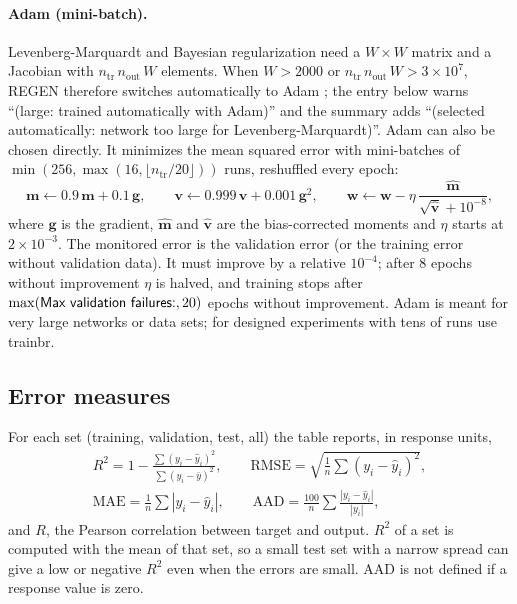 \paragraph{Adam (mini-batch).} Levenberg-Marquardt and Bayesian regularization need a $W\times W$ matrix and a
Jacobian with $n_\text{tr}\,n_\text{out}\,W$ elements. When $W > 2000$ or $n_\text{tr}\,n_\text{out}\,W > 3\times
10^{7}$, REGEN therefore switches automatically to Adam \citep{kingma2015}; the entry below  warns ``(large: trained automatically with Adam)'' and the summary adds ``(selected automatically:
network too large for Levenberg-Marquardt)''. Adam can also be chosen directly. It minimizes the mean squared
error with mini-batches of $\min(256, \max(16, \lfloor n_\text{tr}/20\rfloor))$ runs, reshuffled every epoch:
\begin{equation}
  \mathbf{m} \leftarrow 0.9\,\mathbf{m} + 0.1\,\mathbf{g}, \qquad
  \mathbf{v} \leftarrow 0.999\,\mathbf{v} + 0.001\,\mathbf{g}^2, \qquad
  \mathbf{w} \leftarrow \mathbf{w} - \eta\,\frac{\hat{\mathbf{m}}}{\sqrt{\hat{\mathbf{v}}} + 10^{-8}},
  \label{eq:ch07-adam}
\end{equation}
where $\mathbf{g}$ is the gradient, $\hat{\mathbf{m}}$ and $\hat{\mathbf{v}}$ are the bias-corrected moments and
$\eta$ starts at $2\times10^{-3}$. The monitored error is the validation error (or the training error without
validation data). It must improve by a relative $10^{-4}$; after 8 epochs without improvement $\eta$ is halved,
and training stops after $\max(\text{\textsf{Max validation failures:}}, 20)$ epochs without improvement. Adam is
meant for very large networks or data sets; for designed experiments with tens of runs use trainbr.

\subsection{Error measures}\label{sec:ch07-metrics}

For each set (training, validation, test, all) the  table reports, in response units,
\begin{equation}
\begin{gathered}
  R^2 = 1 - \frac{\sum (y_i - \hat y_i)^2}{\sum (y_i - \bar y)^2}, \qquad
  \text{RMSE} = \sqrt{\tfrac{1}{n}\textstyle\sum (y_i-\hat y_i)^2}, \\
  \text{MAE} = \tfrac{1}{n}\textstyle\sum |y_i-\hat y_i|, \qquad
  \text{AAD} = \tfrac{100}{n}\textstyle\sum \frac{|y_i-\hat y_i|}{|y_i|},
\end{gathered}\label{eq:ch07-metrics}
\end{equation}
and $R$, the Pearson correlation between target and output. $R^2$ of a set is computed with the mean of that set,
so a small test set with a narrow spread can give a low or negative $R^2$ even when the errors are small. AAD is
not defined if a response value is zero.

